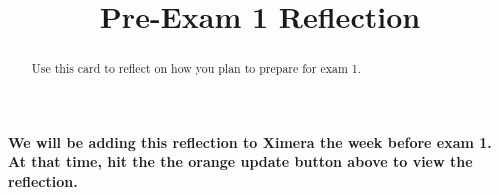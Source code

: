 \documentclass{ximera}
\title[Dig-In:]{Pre-Exam 1 Reflection}
\begin{document}
\begin{abstract}
Use this card to reflect on how you plan to prepare for exam 1.
\end{abstract}
\maketitle

\textbf{We will be adding this reflection to Ximera the week before exam 1.  At that time, hit the the orange update button above to view the reflection.}
\end{document}
